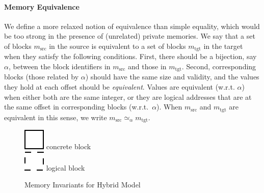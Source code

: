 \paragraph{Memory Equivalence}
We define a more relaxed notion of equivalence than simple equality,
which would be too strong in the presence of (unrelated) private
memories. We say that a set of blocks $m_\textrm{src}$ in the source
is equivalent to a set of blocks $m_\textrm{tgt}$ in the target
when they satisfy the following conditions. First, there should be a
bijection, say $\alpha$, between the block identifiers in
$m_\textrm{src}$ and those in $m_\textrm{tgt}$. Second, corresponding
blocks (\ie those related by $\alpha$) should have the same
size and validity, and the values they hold at each offset should be \emph{equivalent}.  Values are
equivalent (w.r.t. $\alpha$) when either both are the same integer, or
they are logical addresses that are at the same offset in corresponding blocks
(w.r.t.~$\alpha$). When $m_\textrm{src}$ and $m_\textrm{tgt}$ are equivalent in this sense, we write $m_\textrm{src} \simeq_\alpha m_\textrm{tgt}$.

\begin{figure}[t]
\center
  \begin{minipage}[b]{0.5\textwidth}
  \end{minipage}
  \begin{minipage}[b]{0.3\textwidth}
  \includegraphics[scale=0.25]{intptrcast-figure/physical-block.png} concrete block\\[2mm]
  \includegraphics[scale=0.25]{intptrcast-figure/logical-block.png} logical block\\
  \mbox{}
  \end{minipage}
\caption{Memory Invariants for Hybrid Model}\label{fig:invariant}
\end{figure}

